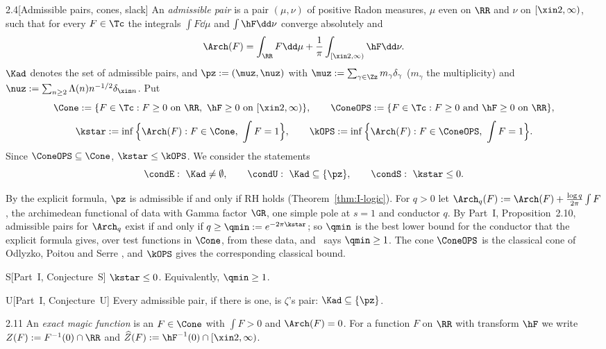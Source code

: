 \begin{Idefinition}{2.4}[Admissible pairs, cones, slack]\label{def:admissible}
An \emph{admissible pair} is a pair $(\mu,\nu)$ of positive Radon measures, $\mu$ even on $\RR$ and $\nu$ on $[\xin2,\infty)$, such that for
every $F\in\Tc$ the integrals $\int F\dd\mu$ and $\int\hF\dd\nu$ converge absolutely and
\[
\Arch(F)=\int_\RR F\dd\mu+\frac1\pi\int_{[\xin2,\infty)}\hF\dd\nu .
\]
$\Kad$ denotes the set of admissible pairs, and $\pz:=(\muz,\nuz)$ with $\muz:=\sum_{\gamma\in\Zz}m_\gamma\delta_\gamma$ ($m_\gamma$ the multiplicity)
and $\nuz:=\sum_{n\ge2}\Lambda(n)n^{-1/2}\delta_{\xin n}$. Put
\[
\Cone:=\{F\in\Tc: F\ge0\text{ on }\RR,\ \hF\ge0\text{ on }[\xin2,\infty)\},\qquad
\ConeOPS:=\{F\in\Tc:F\ge0\text{ and }\hF\ge0\text{ on }\RR\},
\]
\[
\kstar:=\inf\Big\{\Arch(F):F\in\Cone,\ \int F=1\Big\},\qquad \kOPS:=\inf\Big\{\Arch(F):F\in\ConeOPS,\ \int F=1\Big\}.
\]
Since $\ConeOPS\subseteq\Cone$, $\kstar\le\kOPS$. We consider the statements
\[
\condE:\ \Kad\ne\emptyset,\qquad \condU:\ \Kad\subseteq\{\pz\},\qquad \condS:\ \kstar\le0 .
\]
\end{Idefinition}

By the explicit formula, $\pz$ is admissible if and only if RH holds (Theorem~\ref{thm:I-logic}). For $q>0$ let
$\Arch_q(F):=\Arch(F)+\frac{\log q}{2\pi}\int F$, the archimedean functional of data with Gamma factor $\GR$, one simple pole at $s=1$ and
conductor $q$. By Part~I, Proposition~2.10, admissible pairs for $\Arch_q$ exist if and only if $q\ge\qmin:=e^{-2\pi\kstar}$; so $\qmin$ is the
best lower bound for the conductor that the explicit formula gives, over test functions in $\Cone$, from these data, and \condS\ says
$\qmin\ge1$. The cone $\ConeOPS$ is the classical cone of Odlyzko, Poitou and Serre \cite{Odl90,Poi77,Ser75,Sta74}, and $\kOPS$ gives the
corresponding classical bound.

\begin{lconj}{S}[Part~I, Conjecture~S]\label{conj:S}
$\kstar\le0$. Equivalently, $\qmin\ge1$.
\end{lconj}

\begin{lconj}{U}[Part~I, Conjecture~U]\label{conj:U}
Every admissible pair, if there is one, is $\zeta$'s pair: $\Kad\subseteq\{\pz\}$.
\end{lconj}

\begin{Idefinition}{2.11}\label{def:magic}
An \emph{exact magic function} is an $F\in\Cone$ with $\int F>0$ and $\Arch(F)=0$. For a function $F$ on $\RR$ with transform $\hF$ we write
$Z(F):=F^{-1}(0)\cap\RR$ and $\widehat Z(F):=\hF^{-1}(0)\cap[\xin2,\infty)$.
\end{Idefinition}

